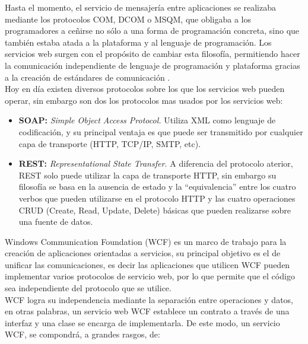 
Hasta el momento, el servicio de mensajería entre aplicaciones se realizaba mediante los protocolos COM, DCOM o MSQM, que obligaba a los programadores a ceñirse no sólo a una forma de programación concreta, sino que también estaba atada a la plataforma y al lenguaje de programación. Los servicios web surgen con el propósito de cambiar esta filosofía, permitiendo hacer la comunicación independiente de lenguaje de programación y plataforma gracias a la creación de estándares de comunicación \cite{WCF15}.
\\

Hoy en día  existen diversos protocolos sobre los que los servicios web pueden operar, sin embargo  son dos los protocolos mas usados por los servicios web:
\begin{itemize}
	\item \textbf{SOAP:} \textit{Simple Object Access Protocol.} Utiliza XML como lenguaje de codificación, y su principal ventaja es que puede ser transmitido por cualquier capa de transporte (HTTP, TCP/IP, SMTP, etc).

	
	\item \textbf{REST:} \textit{Representational State Transfer.} A diferencia del protocolo  aterior, REST solo puede utilizar la capa de transporte HTTP, sin embargo su filosofía se  basa en la ausencia de estado y la “equivalencia” entre los cuatro verbos que pueden utilizarse en el protocolo HTTP y las cuatro operaciones CRUD (Create, Read, Update, Delete) básicas que pueden realizarse sobre una fuente de datos. 
\end{itemize}



 
Windows Communication Foundation (WCF)  es un marco de trabajo para la creación de aplicaciones orientadas a servicios, su principal objetivo  es el de unificar las comunicaciones, es decir las aplicaciones que utilicen WCF pueden  implementar varios protocolos de servicio web, por lo que permite que el código sea independiente del protocolo que se utilice.
\\

WCF logra su independencia mediante la separación entre operaciones y datos, en otras palabras, un servicio web WCF establece un contrato a través de una interfaz y una clase se encarga de implementarla. De este modo, un servicio WCF, se compondrá, a grandes rasgos, de:

